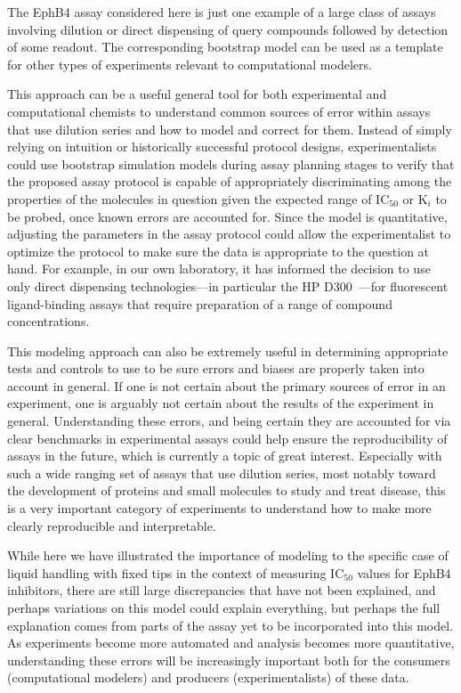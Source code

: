 \documentclass[aps,pre,twocolumn,nofootinbib,superscriptaddress,linenumbers]{revtex4-1}
\begin{document}
The EphB4 assay considered here is just one example of a large class of assays involving dilution or direct dispensing of query compounds followed by detection of some readout.
The corresponding bootstrap model can be used as a template for other types of experiments relevant to computational modelers.

This approach can be a useful general tool for both experimental and computational chemists to understand common sources of error within assays that use dilution series and how to model and correct for them.
Instead of simply relying on intuition or historically successful protocol designs, experimentalists could use bootstrap simulation models during assay planning stages to verify that the proposed assay protocol is capable of appropriately discriminating among the properties of the molecules in question given the expected range of IC$_{ 50}$ or K$_{i}$ to be probed, once known errors are accounted for.
Since the model is quantitative, adjusting the parameters in the assay protocol could allow the experimentalist to optimize the protocol to make sure the data is appropriate to the question at hand. 
For example, in our own laboratory, it has informed the decision to use only direct dispensing technologies---in particular the HP D300~\cite{jones_alternative_2013}---for fluorescent ligand-binding assays that require preparation of a range of compound concentrations.

This modeling approach can also be extremely useful in determining appropriate tests and controls to use to be sure errors and biases are properly taken into account in general. 
If one is not certain about the primary sources of error in an experiment, one is arguably not certain about the results of the experiment in general. 
Understanding these errors, and being certain they are accounted for via clear benchmarks in experimental assays could help ensure the reproducibility of assays in the future, which is currently a topic of great interest. 
Especially with such a wide ranging set of assays that use dilution series, most notably toward the development of proteins and small molecules to study and treat disease, this is a very important category of experiments to understand how to make more clearly reproducible and interpretable.

While here we have illustrated the importance of modeling to the specific case of liquid handling with fixed tips in the context of measuring IC$_{50}$ values for EphB4 inhibitors, there are still large discrepancies that have not been explained, and perhaps variations on this model could explain everything, but perhaps the full explanation comes from parts of the assay yet to be incorporated into this model.
As experiments become more automated and analysis becomes more quantitative, understanding these errors will be increasingly important both for the consumers (computational modelers) and producers (experimentalists) of these data.
\end{document}
